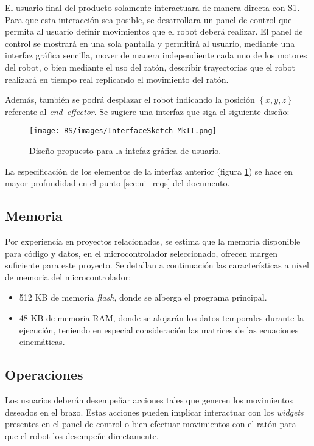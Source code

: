 El usuario final del producto solamente interactuara de manera directa con \ac{S1}.
Para que esta interacción sea posible, se desarrollara un panel de control que permita al usuario definir movimientos que el robot deberá realizar. El panel de control se mostrará en una sola pantalla y permitirá al usuario, mediante una interfaz gráfica sencilla, mover de manera independiente cada uno de los motores del robot, o bien mediante el uso del ratón, describir trayectorias que el robot realizará en tiempo real replicando el movimiento del ratón.

Además, también se podrá desplazar el robot indicando la posición $\left\{x, y, z\right\}$ referente al \textit{end--effector}. Se sugiere una interfaz que siga el siguiente diseño:

\begin{figure}[H]
    \centering
    \texttt{[image: RS/images/InterfaceSketch-MkII.png]}
    \caption{Diseño propuesto para la intefaz gráfica de usuario.}
    \label{fig:ui_design}
\end{figure}

La especificación de los elementos de la interfaz anterior (figura \ref{fig:ui_design}) se hace en mayor profundidad en el punto \ref{sec:ui_reqs} del documento.

\subsection{Memoria}

Por experiencia en proyectos relacionados, se estima que la memoria disponible para 
código y datos, en el microcontrolador seleccionado, ofrecen margen suficiente para este
proyecto. Se detallan a continuación las características a nivel de memoria del
microcontrolador:

\begin{itemize}
    \item 512 KB de memoria \textit{flash}, donde se alberga el programa principal.
    \item 48 KB de memoria \ac{RAM}, donde se alojarán los datos temporales durante la ejecución, teniendo en especial consideración las matrices de las ecuaciones cinemáticas.
\end{itemize}

\subsection{Operaciones}

Los usuarios deberán desempeñar acciones tales que generen los movimientos deseados en el brazo. Estas acciones pueden implicar interactuar con los \textit{widgets} presentes en el panel de control o bien efectuar movimientos con el ratón para que el robot los desempeñe directamente.
